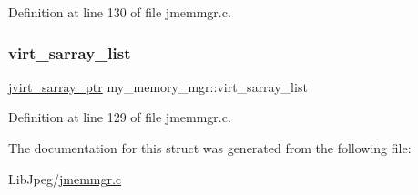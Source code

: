 Definition at line 130 of file jmemmgr.\+c.

\mbox{\label{structmy__memory__mgr_ad613a2a2e52ac069c63fd083c9c91f04}} 
\subsubsection{\texorpdfstring{virt\_sarray\_list}{virt\_sarray\_list}}
{\footnotesize\ttfamily \mbox{\hyperlink{jpeglib_8h_abc0b975077507c35b5a577e3ce9e4d91}{jvirt\+\_\+sarray\+\_\+ptr}} my\+\_\+memory\+\_\+mgr\+::virt\+\_\+sarray\+\_\+list}



Definition at line 129 of file jmemmgr.\+c.



The documentation for this struct was generated from the following file\+:\begin{DoxyCompactItemize}
\item 
Lib\+Jpeg/\mbox{\hyperlink{jmemmgr_8c}{jmemmgr.\+c}}\end{DoxyCompactItemize}

